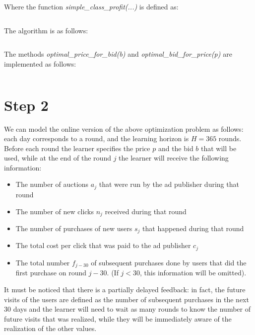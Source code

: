 \documentclass[11pt]{article} %
\begin{document}
Where the function \textit{simple\_class\_profit(...)} is defined as:
\inputminted{python}{code/step1_simple_class_profit.py}
\begin{samepage}
The algorithm is as follows:
\inputminted{python}{code/step1.py}
\end{samepage}
The methods \textit{optimal\_price\_for\_bid(b)} and \textit{optimal\_bid\_for\_price(p)} are implemented as follows:
\inputminted{python}{code/step1_support.py}

\clearpage
\section{Step 2}
We can model the online version of the above optimization problem as follows: each day corresponds to a round, and the learning horizon is $H=365$ rounds. Before each round the learner specifies the price $p$ and the bid $b$ that will be used, while at the end of the round $j$ the learner will receive the following information:
\begin{itemize}
\item The number of auctions $a_j$ that were run by the ad publisher during that round
\item The number of new clicks  $n_j$ received during that round
\item The number of purchases of new users $s_j$ that happened during that round 
\item The total cost per click that was paid to the ad publisher $c_j$
\item The total number $f_{j-30}$ of subsequent purchases done by users that did the first purchase on round $j-30$. (If $j < 30$, this information will be omitted).
\end{itemize}
It must be noticed that there is a partially delayed feedback: in fact, the future visits of the users are defined as the number of subsequent purchases in the next 30 days and the learner will need to wait as many rounds to know the number of future visits that was realized, while they will be immediately aware of the realization of the other values.\\
\end{document}

